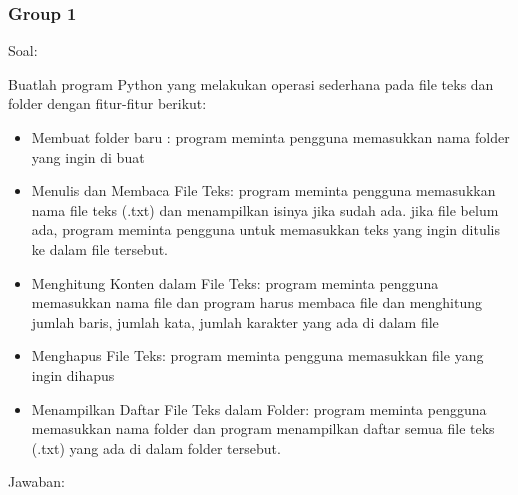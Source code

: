 \documentclass[12pt]{article}
\begin{document}
\subsubsection{Group 1}
Soal:
\par Buatlah program Python yang melakukan operasi sederhana pada file teks dan folder dengan fitur-fitur berikut:
\begin{itemize}
    \item Membuat folder baru : program meminta pengguna memasukkan nama folder yang ingin di buat
    \item Menulis dan Membaca File Teks: program meminta pengguna memasukkan nama file teks (.txt) dan menampilkan isinya jika sudah ada. jika file belum ada, program meminta pengguna untuk memasukkan teks yang ingin ditulis ke dalam file tersebut.
    \item Menghitung Konten dalam File Teks: program meminta pengguna memasukkan nama file dan program harus membaca file dan menghitung jumlah baris, jumlah kata, jumlah karakter yang ada di dalam file
    \item Menghapus File Teks: program meminta pengguna memasukkan file yang ingin dihapus
    \item Menampilkan Daftar File Teks dalam Folder: program meminta pengguna memasukkan nama folder dan program menampilkan daftar semua file teks (.txt) yang ada di dalam folder tersebut.
\end{itemize}
Jawaban:
\end{document}
